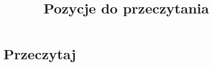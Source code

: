 \documentclass[a4paper,11pt]{article}
\title{Pozycje do przeczytania}
\begin{document}





\maketitle  %





\section{Przeczytaj}

\vspace{\spaceTwo}
\end{document}
